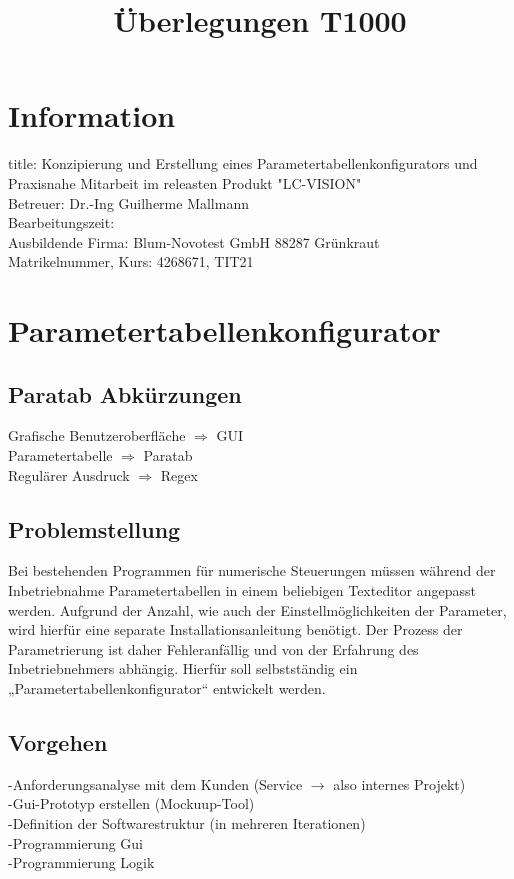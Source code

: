 \documentclass[12pt,a4paper]{article}
\title{Überlegungen T1000}
\begin{document}
\noindent
\section{Information}
title: Konzipierung und Erstellung eines Parametertabellenkonfigurators und Praxisnahe Mitarbeit im releasten Produkt "LC-VISION"\\
Betreuer: Dr.-Ing Guilherme Mallmann \\
Bearbeitungszeit: \\
Ausbildende Firma: Blum-Novotest GmbH 88287 Grünkraut\\
Matrikelnummer, Kurs: 4268671, TIT21\\
\section{Parametertabellenkonfigurator}
\subsection{Paratab Abkürzungen}
Grafische Benutzeroberfläche $\Rightarrow$ GUI\\
Parametertabelle $\Rightarrow$ Paratab\\
Regulärer Ausdruck $\Rightarrow$ Regex
\subsection{Problemstellung}
Bei bestehenden Programmen für numerische Steuerungen müssen während der Inbetriebnahme Parametertabellen in einem beliebigen Texteditor angepasst werden. Aufgrund der Anzahl, wie auch der Einstellmöglichkeiten der Parameter, wird hierfür eine separate Installationsanleitung benötigt. Der Prozess der Parametrierung ist daher Fehleranfällig und von der Erfahrung des Inbetriebnehmers abhängig. Hierfür soll selbstständig ein „Parametertabellenkonfigurator“ entwickelt werden.
\subsection{Vorgehen}
-Anforderungsanalyse mit dem Kunden (Service $\rightarrow$ also internes Projekt)\\
-Gui-Prototyp erstellen (Mockuup-Tool)\\
-Definition der Softwarestruktur (in mehreren Iterationen)\\
-Programmierung Gui\\
-Programmierung Logik\\
\end{document}
